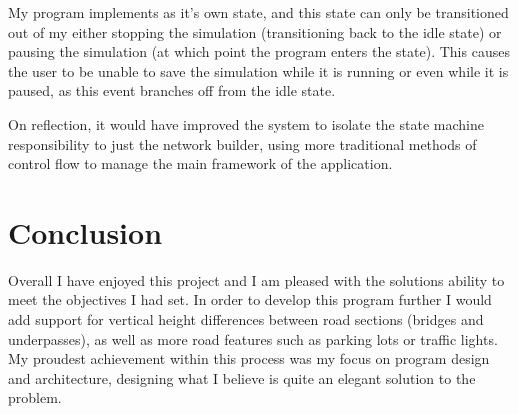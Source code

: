         My program implements  as it's own state, and this state can only be transitioned out of my either stopping the simulation (transitioning back to the idle state) or pausing the simulation (at which point the program enters the  state). This causes the user to be unable to save the simulation while it is running or even while it is paused, as this event branches off from the idle state.

        On reflection, it would have improved the system to isolate the state machine responsibility to just the network builder, using more traditional methods of control flow to manage the main framework of the application.

\section{Conclusion}

    Overall I have enjoyed this project and I am pleased with the solutions ability to meet the objectives I had set. In order to develop this program further I would add support for vertical height differences between road sections (bridges and underpasses), as well as more road features such as parking lots or traffic lights. My proudest achievement within this process was my focus on program design and architecture, designing what I believe is quite an elegant solution to the problem.

